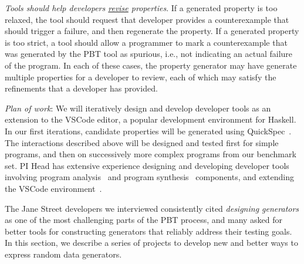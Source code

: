 \textit{Tools should help developers \underline{revise} properties}. If a generated
property is too relaxed, the tool should request that developer provides a
counterexample that should trigger a failure, and then regenerate the property.
If a generated property is too strict, a tool should allow a programmer to mark
a counterexample that was generated by the PBT tool as spurious, i.e., not
indicating an actual failure of the program. In each of these cases, the
property generator may have generate multiple properties for a developer to
review, each of which may satisfy the refinements that a developer has provided.

\textit{Plan of work}: We will iteratively design and develop developer tools as
an extension to the VSCode editor, a popular development environment for
Haskell. In our first iterations, candidate properties will be generated using
QuickSpec~\cite{claessen2010quickspec}. The interactions described above will be
designed and tested first for simple programs, and then on successively more
complex programs from our benchmark set. PI Head has extensive experience
designing and developing developer tools involving program
analysis~\cite{head2018interactive,head2019managing} and program
synthesis~\cite{head2017writing} components, and extending the VSCode
environment~\cite{head2020composing}.   

%
The Jane Street developers we interviewed consistently
cited {\em designing generators} as one of the most challenging parts of the
PBT process, and many
asked for better tools for constructing generators that reliably address
their testing goals. In this section, we describe a series of projects
to develop new and better ways to express random data generators.

%
  

